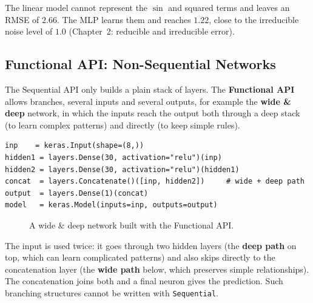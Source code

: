 \noindent The linear model cannot represent the $\sin$ and squared terms and leaves an RMSE of $2.66$. The MLP learns them and reaches $1.22$, close to the irreducible noise level of $1.0$ (Chapter~2: reducible and irreducible error).

\subsection{Functional API: Non-Sequential Networks}

The Sequential API only builds a plain stack of layers. The \textbf{Functional API} allows branches, several inputs and several outputs, for example the \textbf{wide \& deep} network, in which the inputs reach the output both through a deep stack (to learn complex patterns) and directly (to keep simple rules).

\begin{lstlisting}
inp    = keras.Input(shape=(8,))
hidden1 = layers.Dense(30, activation="relu")(inp)
hidden2 = layers.Dense(30, activation="relu")(hidden1)
concat  = layers.Concatenate()([inp, hidden2])     # wide + deep path
output  = layers.Dense(1)(concat)
model   = keras.Model(inputs=inp, outputs=output)
\end{lstlisting}

\begin{figure}[!htbp]
\centering
{}
\caption{A wide \& deep network built with the Functional API.}\label{fig:widedeep}
\end{figure}

\begin{explain}
The input is used twice: it goes through two hidden layers (the \textbf{deep path} on top, which can learn complicated patterns) and also skips directly to the concatenation layer (the \textbf{wide path} below, which preserves simple relationships). The concatenation joins both and a final neuron gives the prediction. Such branching structures cannot be written with \texttt{Sequential}.
\end{explain}

